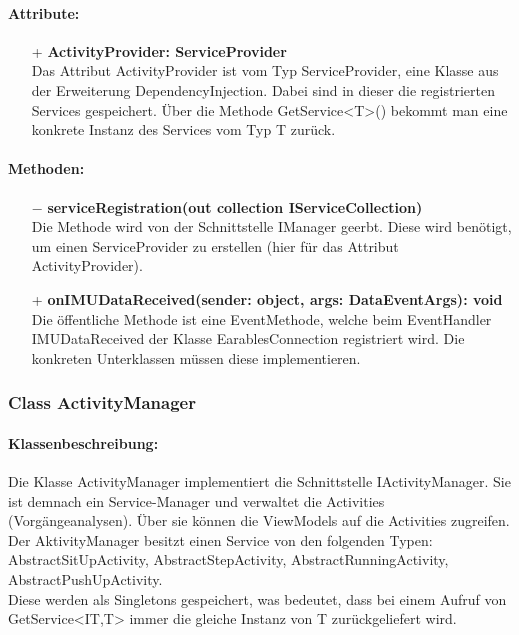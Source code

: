\documentclass[a4paper,12pt]{article}
\begin{document}
	\paragraph{Attribute:}
	\begin{itemize}
		\item[+] \textbf{ActivityProvider: ServiceProvider}\\Das Attribut ActivityProvider ist vom Typ ServiceProvider, eine Klasse aus der Erweiterung \Gls{DependencyInjection}. Dabei sind in dieser die registrierten Services gespeichert. Über die Methode GetService<T>() bekommt man eine konkrete Instanz des Services vom Typ T zurück. 
	\end{itemize}
	
	\paragraph{Methoden:}
	\begin{itemize}
		\item[$-$] \textbf{serviceRegistration(out collection IServiceCollection)}\\Die Methode wird von der Schnittstelle IManager geerbt. Diese wird benötigt, um einen ServiceProvider zu erstellen (hier für das Attribut ActivityProvider).
		\item[+] \textbf{onIMUDataReceived(sender: object, args: DataEventArgs): void}\\Die öffentliche Methode ist eine EventMethode, welche beim EventHandler IMUDataReceived der Klasse EarablesConnection registriert wird. Die konkreten Unterklassen müssen diese implementieren. 
	\end{itemize}
	
	\subsubsection{Class ActivityManager}
	\paragraph{Klassenbeschreibung:}
	Die Klasse ActivityManager implementiert die Schnittstelle IActivityManager. Sie ist demnach ein Service-Manager und verwaltet die Activities (Vorgängeanalysen). Über sie können die ViewModels auf die Activities zugreifen.\\
	Der AktivityManager besitzt einen Service von den folgenden Typen: AbstractSitUpActivity, AbstractStepActivity, AbstractRunningActivity, AbstractPushUpActivity.\\
	Diese werden als Singletons gespeichert, was bedeutet, dass bei einem Aufruf von GetService<IT,T> immer die gleiche Instanz von T zurückgeliefert wird.
	
\end{document}
